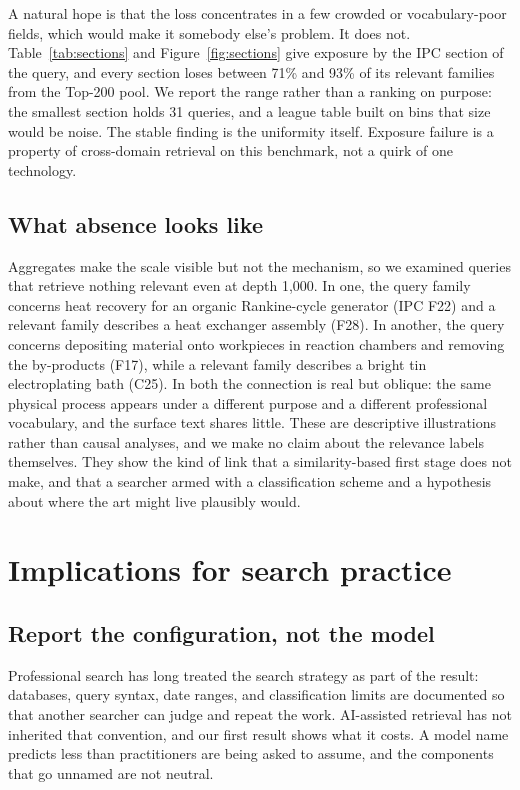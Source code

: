 \documentclass[preprint,11pt,authoryear]{elsarticle}          %
\begin{document}
A natural hope is that the loss concentrates in a few crowded or vocabulary-poor fields, which would make it somebody else's problem. It does not. Table~\ref{tab:sections} and Figure~\ref{fig:sections} give exposure by the IPC section of the query, and every section loses between 71\% and 93\% of its relevant families from the Top-200 pool. We report the range rather than a ranking on purpose: the smallest section holds 31 queries, and a league table built on bins that size would be noise. The stable finding is the uniformity itself. Exposure failure is a property of cross-domain retrieval on this benchmark, not a quirk of one technology.

\subsection{What absence looks like}

Aggregates make the scale visible but not the mechanism, so we examined queries that retrieve nothing relevant even at depth 1{,}000. In one, the query family concerns heat recovery for an organic Rankine-cycle generator (IPC F22) and a relevant family describes a heat exchanger assembly (F28). In another, the query concerns depositing material onto workpieces in reaction chambers and removing the by-products (F17), while a relevant family describes a bright tin electroplating bath (C25). In both the connection is real but oblique: the same physical process appears under a different purpose and a different professional vocabulary, and the surface text shares little. These are descriptive illustrations rather than causal analyses, and we make no claim about the relevance labels themselves. They show the kind of link that a similarity-based first stage does not make, and that a searcher armed with a classification scheme and a hypothesis about where the art might live plausibly would.

\section{Implications for search practice}
\label{sec:implications}

\subsection{Report the configuration, not the model}

Professional search has long treated the search strategy as part of the result: databases, query syntax, date ranges, and classification limits are documented so that another searcher can judge and repeat the work. AI-assisted retrieval has not inherited that convention, and our first result shows what it costs. A model name predicts less than practitioners are being asked to assume, and the components that go unnamed are not neutral.
\end{document}

